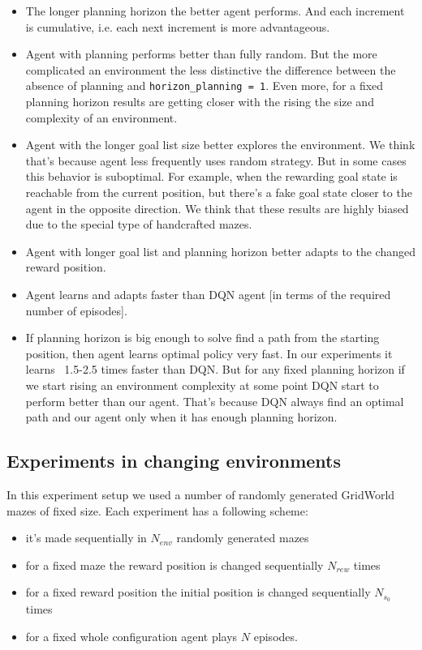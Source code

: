 \documentclass[runningheads]{llncs}
\begin{document}
\begin{itemize}
  \item The longer planning horizon the better agent performs. And each increment is cumulative, i.e. each next increment is more advantageous.
  
  \item Agent with planning performs better than fully random. But the more complicated an environment the less distinctive the difference between the absence of planning and \verb|horizon_planning = 1|. Even more, for a fixed planning horizon results are getting closer with the rising the size and complexity of an environment.
  
  \item Agent with the longer goal list size better explores the environment. We think that's because agent less frequently uses random strategy. But in some cases this behavior is suboptimal. For example, when the rewarding goal state is reachable from the current position, but there's a fake goal state closer to the agent in the opposite direction. We think that these results are highly biased due to the special type of handcrafted mazes.
  
  \item Agent with longer goal list and planning horizon better adapts to the changed reward position.
  \item Agent learns and adapts faster than DQN agent [in terms of the required number of episodes].
  \item If planning horizon is big enough to solve find a path from the starting position, then agent learns optimal policy very fast. In our experiments it learns ~1.5-2.5 times faster than DQN. But for any fixed planning horizon if we start rising an environment complexity at some point DQN start to perform better than our agent. That's because DQN always find an optimal path and our agent only when it has enough planning horizon.
\end{itemize}

\subsection{Experiments in changing environments}

In this experiment setup we used a number of randomly generated GridWorld mazes of fixed size. Each experiment has a following scheme:

\begin{itemize}
  \item it's made sequentially in $N_{env}$ randomly generated mazes
  \item for a fixed maze the reward position is changed sequentially $N_{rew}$ times
  \item for a fixed reward position the initial position is changed sequentially $N_{s_0}$ times
  \item for a fixed whole configuration agent plays $N$ episodes.
\end{itemize}
\end{document}
